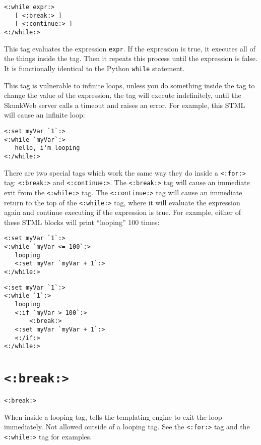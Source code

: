 \documentclass{manual}
\begin{document}
\begin{verbatim}<:while expr:>
   [ <:break:> ]
   [ <:continue:> ]
<:/while:>
\end{verbatim}

This tag evaluates the expression \texttt{expr}. If the expression
is true, it executes all of the things inside the tag. Then it
repeats this process until the expression is false. It is functionally
identical to the Python \texttt{while} statement.

This tag is vulnerable to infinite loops, unless you do something
inside the tag to change the value of the expression, the tag will
execute indefinitely, until the SkunkWeb server calls a timeout and
raises an error. For example, this STML will cause an infinite loop:

\begin{verbatim}
<:set myVar `1`:>
<:while `myVar`:>
   hello, i'm looping
<:/while:>
\end{verbatim}

There are two special tags which work the same way they do inside
a \texttt{<:for:>} tag: \texttt{<:break:>} and 
\texttt{<:continue:>}. The \texttt{<:break:>} tag will
cause an immediate exit from the \texttt{<:while:>} tag.
The \texttt{<:continue:>} tag will cause an immediate return
to the top of the \texttt{<:while:>} tag, where it will
evaluate the expression again and continue executing if the expression
is true. For example, either of these STML blocks will print 
``looping'' 100 times:

\begin{verbatim}
<:set myVar `1`:>
<:while `myVar <= 100`:>
   looping
   <:set myVar `myVar + 1`:>
<:/while:>
\end{verbatim}

\begin{verbatim}
<:set myVar `1`:>
<:while `1`:>
   looping
   <:if `myVar > 100`:>
       <:break:>
   <:set myVar `myVar + 1`:>
   <:/if:>
<:/while:>
\end{verbatim}


\section{\texttt{<:break:>}}
\label{tagbreak}

\begin{verbatim}<:break:>\end{verbatim}

When inside a looping tag, tells the templating engine to exit
the loop immediately. Not allowed outside of a looping tag.
See the \texttt{<:for:>}  tag
and the \texttt{<:while:>}  tag
for examples.
\end{document}
